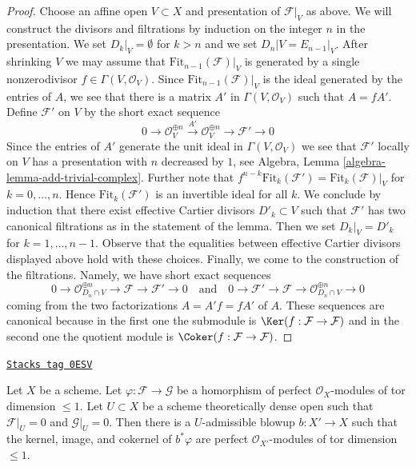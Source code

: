 \begin{proof}
\medskip\noindent
Choose an affine open $V \subset X$ and presentation of $\mathcal{F}|_V$
as above. We will construct the divisors and filtrations by induction
on the integer $n$ in the presentation. We set $D_k|_V = \emptyset$
for $k > n$ and we set $D_n|V = E_{n - 1}|_V$.
After shrinking $V$ we may assume that
$\text{Fit}_{n - 1}(\mathcal{F})|_V$ is generated by a
single nonzerodivisor $f \in \Gamma(V, \mathcal{O}_V)$.
Since $\text{Fit}_{n - 1}(\mathcal{F})|_V$ is the ideal generated
by the entries of $A$, we see that there is a matrix
$A'$ in $\Gamma(V, \mathcal{O}_V)$ such that $A = fA'$.
Define $\mathcal{F}'$ on $V$ by the short exact sequence
$$
0 \to \mathcal{O}_V^{\oplus n} \xrightarrow{A'} \mathcal{O}_V^{\oplus n} \to
\mathcal{F}' \to 0
$$
Since the entries of $A'$ generate the unit ideal in
$\Gamma(V, \mathcal{O}_V)$ we see that $\mathcal{F}'$
locally on $V$ has a presentation with $n$ decreased
by $1$, see Algebra, Lemma \ref{algebra-lemma-add-trivial-complex}.
Further note that
$f^{n - k}\text{Fit}_k(\mathcal{F}') = \text{Fit}_k(\mathcal{F})|_V$
for $k = 0, \ldots, n$. Hence $\text{Fit}_k(\mathcal{F}')$
is an invertible ideal for all $k$. We conclude by induction
that there exist effective Cartier divisors $D'_k \subset V$
such that $\mathcal{F}'$ has two canonical filtrations as in the statement
of the lemma. Then we set $D_k|_V = D'_k$ for $k = 1, \ldots, n - 1$.
Observe that the equalities between effective Cartier divisors
displayed above hold with these choices. Finally, we come
to the construction of the filtrations. Namely,
we have short exact sequences
$$
0 \to
\mathcal{O}_{D_n \cap V}^{\oplus n} \to
\mathcal{F} \to \mathcal{F}' \to 0
\quad\text{and}\quad
0 \to
\mathcal{F}' \to \mathcal{F} \to
\mathcal{O}_{D_n \cap V}^{\oplus n} \to 0
$$
coming from the two factorizations $A = A'f = f A'$ of $A$.
These sequences are canonical because in the first one
the submodule is $\Ker(f : \mathcal{F} \to \mathcal{F})$
and in the second one the quotient module is
$\Coker(f : \mathcal{F} \to \mathcal{F})$.
\end{proof}

\begin{lemma}
\label{flat-lemma-blowup-map-pd1}
\href{https://stacks.math.columbia.edu/tag/0ESV}{\texttt{Stacks tag 0ESV}}

Let $X$ be a scheme. Let $\varphi : \mathcal{F} \to \mathcal{G}$
be a homorphism of perfect $\mathcal{O}_X$-modules of tor dimension $\leq 1$.
Let $U \subset X$ be a scheme theoretically dense open
such that $\mathcal{F}|_U = 0$ and $\mathcal{G}|_U = 0$.
Then there is a $U$-admissible blowup $b : X' \to X$ such that
the kernel, image, and cokernel of $b^*\varphi$ are
perfect $\mathcal{O}_{X'}$-modules of tor dimension $\leq 1$.
\end{lemma}

